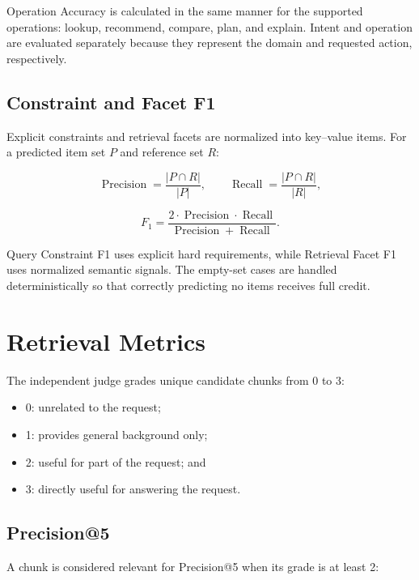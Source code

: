Operation Accuracy is calculated in the same manner for the supported
operations: lookup, recommend, compare, plan, and explain. Intent and operation
are evaluated separately because they represent the domain and requested
action, respectively.

\subsection{Constraint and Facet F1}

Explicit constraints and retrieval facets are normalized into key--value
items. For a predicted item set $P$ and reference set $R$:

\begin{equation}
\operatorname{Precision}=\frac{|P\cap R|}{|P|},\qquad
\operatorname{Recall}=\frac{|P\cap R|}{|R|},
\end{equation}

\begin{equation}
F_1=\frac{2\cdot\operatorname{Precision}\cdot\operatorname{Recall}}
{\operatorname{Precision}+\operatorname{Recall}}.
\end{equation}

Query Constraint F1 uses explicit hard requirements, while Retrieval Facet F1
uses normalized semantic signals. The empty-set cases are handled
deterministically so that correctly predicting no items receives full credit.

\section{Retrieval Metrics}

The independent judge grades unique candidate chunks from 0 to 3:

\begin{itemize}
    \item 0: unrelated to the request;
    \item 1: provides general background only;
    \item 2: useful for part of the request; and
    \item 3: directly useful for answering the request.
\end{itemize}

\subsection{Precision@5}

A chunk is considered relevant for Precision@5 when its grade is at least 2:

